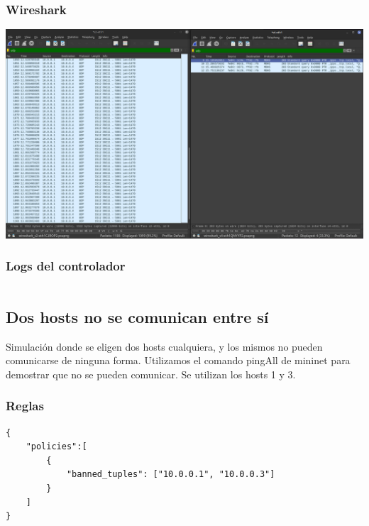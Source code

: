 \documentclass{article}
\begin{document}
\subsubsection{Wireshark}
\begin{center}
\includegraphics[scale=0.2]{Multi_Rules_WS_.png}

\end{center}

\subsubsection{Logs del controlador}
\begin{center}
  \inputminted[fontsize=\footnotesize]{text}{informe/logs/Multi_Rules_WS.txt}
  
\end{center}

\subsection{Dos hosts no se comunican entre sí}
Simulación donde se eligen dos hosts cualquiera, y los mismos no pueden comunicarse de ninguna forma. Utilizamos el comando pingAll de mininet para demostrar que no se pueden comunicar. Se utilizan los hosts 1 y 3.

\subsubsection{Reglas}
\begin{verbatim}
{
    "policies":[
        {
            "banned_tuples": ["10.0.0.1", "10.0.0.3"]
        }
    ]
}
\end{verbatim}
\end{document}
